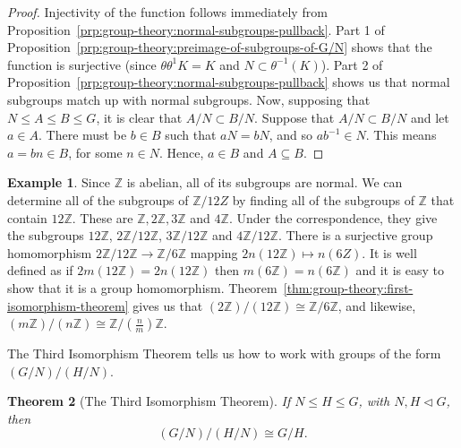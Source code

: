 \documentclass[12pt]{report}
\newcommand{\Z}{\mathbb{Z}}
\newcommand{\iso}{\cong}
\newtheorem{theorem}{Theorem}[section] %
\theoremstyle{definition}
\newtheorem{example}[theorem]{Example}
\begin{document}
\begin{proof}
  Injectivity of the function follows immediately from Proposition~\ref{prp:group-theory:normal-subgroups-pullback}.
  Part 1 of Proposition~\ref{prp:group-theory:preimage-of-subgroups-of-G/N} shows that the function is surjective (since \(\theta\theta^{1}K = K\) and \(N \subset \theta^{-1}(K)\)).
  Part 2 of Proposition~\ref{prp:group-theory:normal-subgroups-pullback} shows us that normal subgroups match up with normal subgroups.
  Now, supposing that \(N \leq A \leq B \leq G\), it is clear that \(A/N \subset B/N\).
  Suppose that \(A/N \subset B/N\) and let \(a \in A\).
  There must be \(b \in B\) such that \(aN = bN\), and so \(ab^{-1} \in N\).
  This means \(a = bn \in B\), for some \(n \in N\).
  Hence, \(a \in B\) and \(A \subseteq B\).
\end{proof}

\begin{example}
  Since \(\Z\) is abelian, all of its subgroups are normal.
  We can determine all of the subgroups of \(\Z/12Z\) by finding all of the subgroups of \(\Z\) that contain \(12\Z\).
  These are \(\Z, 2\Z, 3\Z\) and \(4\Z\).
  Under the correspondence, they give the subgroups \(12\Z\), \(2\Z / 12\Z\), \(3\Z / 12\Z\) and \(4\Z / 12\Z\).
  There is a surjective group homomorphism \(2\Z / 12\Z \to \Z/6\Z\) mapping \(2n(12\Z) \mapsto n(6Z)\).
  It is well defined as if \(2m(12\Z) = 2n(12\Z)\) then \(m(6\Z) = n(6\Z)\) and it is easy to show that it is a group homomorphism.
  Theorem~\ref{thm:group-theory:first-isomorphism-theorem} gives us that \((2\Z) / (12\Z) \iso \Z/6\Z\), and likewise, \((m\Z) / (n\Z) \iso \Z/(\frac n m)\Z\).
\end{example}

The Third Isomorphism Theorem tells us how to work with groups of the form \((G/N)/(H/N)\).

\begin{theorem}[The Third Isomorphism Theorem]
  \label{thm:group-theory:the-third-isomorphism-theorem}
  If \(N \leq H \leq G\), with \(N, H \triangleleft G\), then
  \[(G/N)/(H/N) \iso G/H.\]
\end{theorem}
\end{document}
